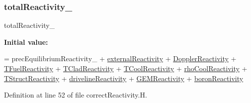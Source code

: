 \subsubsection{\texorpdfstring{total\+Reactivity\+\_\+}{totalReactivity\_}}
{\footnotesize\ttfamily total\+Reactivity\+\_\+}

{\bfseries Initial value\+:}
\begin{DoxyCode}
=
        precEquilibriumReactivity\_
    +   \hyperlink{correctReactivity_8H_a49d2206965ac3f071748e09ceea41464}{externalReactivity}
    +   \hyperlink{correctReactivity_8H_a97ec3a97197bf7af2871ff8259a115cb}{DopplerReactivity}
    +   \hyperlink{correctReactivity_8H_ac279a1e670b326f29df719fce851db8b}{TFuelReactivity}
    +   \hyperlink{correctReactivity_8H_a7383c4c5d0651354b624fec6754739a7}{TCladReactivity}
    +   \hyperlink{correctReactivity_8H_a2f8900e0caab4a682522f17af1ec8c1d}{TCoolReactivity}
    +   \hyperlink{correctReactivity_8H_ad58b239c992acdaf252773123854e721}{rhoCoolReactivity}
    +   \hyperlink{correctReactivity_8H_ac012a5ef75a40fa44a9cf33c92481b1a}{TStructReactivity}
    +   \hyperlink{correctReactivity_8H_a4123ba5c14b80bace1311b38609d90c7}{drivelineReactivity}
    +   \hyperlink{correctReactivity_8H_a0231f7ecfd7d54d20d29bb0703abe776}{GEMReactivity}
    +   \hyperlink{correctReactivity_8H_a504c6e003816d4907d35ee2d84317aaa}{boronReactivity}
\end{DoxyCode}


Definition at line 52 of file correct\+Reactivity.\+H.

